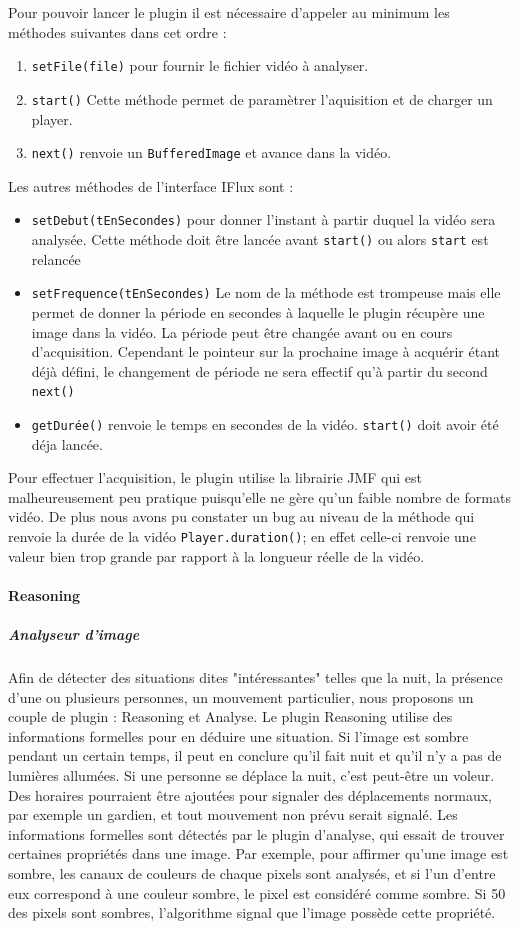 		Pour pouvoir lancer le plugin il est nécessaire d'appeler au minimum les méthodes suivantes dans cet ordre :
		\begin{enumerate}
			\item{\verb+setFile(file)+} pour fournir le fichier vidéo à analyser.
			\item{\verb+start()+} Cette méthode permet de paramètrer l'aquisition et de charger un player. 
			\item{\verb+next()+} renvoie un \verb+BufferedImage+ et avance dans la vidéo.
		\end{enumerate}

		Les autres méthodes de l'interface IFlux sont :
		\begin{itemize}
			\item{\verb+setDebut(tEnSecondes)+} pour donner l'instant à partir duquel la vidéo sera analysée. Cette méthode doit être lancée avant \verb+start()+ ou alors \verb+start+ est relancée
			\item{\verb+setFrequence(tEnSecondes)+} Le nom de la méthode est trompeuse mais elle permet de donner la période en secondes à laquelle le plugin récupère une image dans la vidéo. La période peut être changée avant ou en cours d'acquisition. Cependant le pointeur sur la prochaine image à acquérir étant déjà défini, le changement de période ne sera effectif qu'à partir du second \verb+next()+
			\item{\verb+getDurée()+} renvoie le temps en secondes de la vidéo. \verb+start()+ doit avoir été déja lancée.
		\end{itemize}

	Pour effectuer l'acquisition, le plugin utilise la librairie JMF qui est malheureusement peu pratique puisqu'elle ne gère qu'un faible nombre de formats vidéo. De plus nous avons pu constater un bug au niveau de la méthode qui renvoie la durée de la vidéo \verb+Player.duration()+; en effet celle-ci renvoie une valeur bien trop grande par rapport à la longueur réelle de la vidéo.

		\paragraph{Reasoning}
			\subparagraph{Analyseur d'image}
				Afin de détecter des situations dites "intéressantes" telles que la nuit, la présence d'une ou plusieurs personnes, un mouvement particulier, nous proposons un couple de plugin : Reasoning et Analyse. Le plugin Reasoning utilise des informations formelles pour en déduire une situation. Si l'image est sombre pendant un certain temps, il peut en conclure qu'il fait nuit et qu'il n'y a pas de lumières allumées. Si une personne se déplace la nuit, c'est peut-être un voleur. Des horaires pourraient être ajoutées pour signaler des déplacements normaux, par exemple un gardien, et tout mouvement non prévu serait signalé.
	Les informations formelles sont détectés par le plugin d'analyse, qui essait de trouver certaines propriétés dans une image. Par exemple, pour affirmer qu'une image est sombre, les canaux de couleurs de chaque pixels sont analysés, et si l'un d'entre eux correspond à une couleur sombre, le pixel est considéré comme sombre. Si 50 des pixels sont sombres, l'algorithme signal que l'image possède cette propriété.
	
